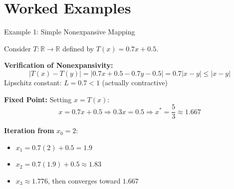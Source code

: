 \documentclass[aspectratio=169,10pt]{beamer}
\begin{document}
\section{Worked Examples}

\begin{frame}[fragile]{Example 1: Simple Nonexpansive Mapping}
    \begin{example}
        Consider $T: \mathbb{R} \to \mathbb{R}$ defined by $T(x) = 0.7x + 0.5$.

        \textbf{Verification of Nonexpansivity:}
        \[
        |T(x) - T(y)| = |0.7x + 0.5 - 0.7y - 0.5| = 0.7|x - y| \leq |x - y|
        \]
        Lipschitz constant: $L = 0.7 < 1$ (actually contractive)

        \vspace{0.3cm}

        \textbf{Fixed Point:}
        Setting $x = T(x)$:
        \[
        x = 0.7x + 0.5 \Rightarrow 0.3x = 0.5 \Rightarrow x^* = \frac{5}{3} \approx 1.667
        \]

        \textbf{Iteration from } $x_0 = 2$:
        \begin{itemize}
            \item $x_1 = 0.7(2) + 0.5 = 1.9$
            \item $x_2 = 0.7(1.9) + 0.5 \approx 1.83$
            \item $x_3 \approx 1.776$, then converges toward $1.667$
        \end{itemize}
    \end{example}
\end{frame}
\end{document}
